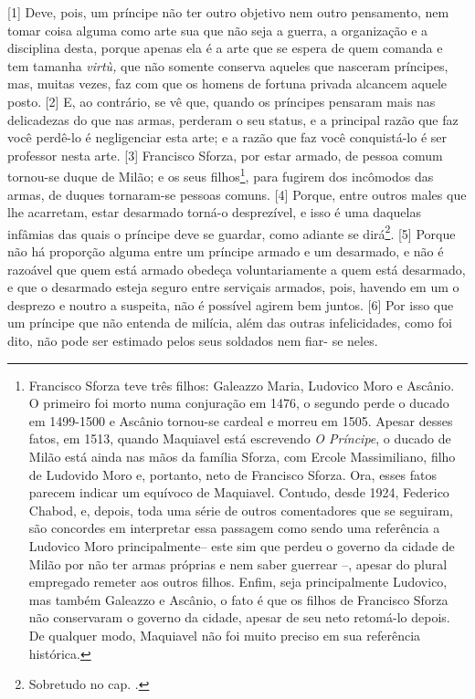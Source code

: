 {[}1{]} Deve, pois, um príncipe não ter outro objetivo nem outro
pensamento, nem tomar coisa alguma como arte sua que não seja a guerra,
a organização e a disciplina desta, porque apenas ela é a arte que se
espera de quem comanda e tem tamanha \emph{virtù,} que não somente
conserva aqueles que nasceram príncipes, mas, muitas vezes, faz com que
os homens de fortuna privada alcancem aquele posto. {[}2{]} E, ao
contrário, se vê que, quando os príncipes pensaram mais nas delicadezas
do que nas armas, perderam o seu status, e a principal razão que faz
você perdê-lo é negligenciar esta arte; e a razão que faz você
conquistá-lo é ser professor nesta arte. {[}3{]} Francisco Sforza, por
estar armado, de pessoa comum tornou-se duque de Milão; e os seus
filhos\footnote{Francisco Sforza teve três filhos: Galeazzo Maria,
  Ludovico Moro e Ascânio. O primeiro foi morto numa conjuração em 1476,
  o segundo perde o ducado em 1499-1500 e Ascânio tornou-se cardeal e
  morreu em 1505. Apesar desses fatos, em 1513, quando Maquiavel está
  escrevendo \emph{O Príncipe}, o ducado de Milão está ainda nas mãos da
  família Sforza, com Ercole Massimiliano, filho de Ludovido Moro e,
  portanto, neto de Francisco Sforza. Ora, esses fatos parecem indicar
  um equívoco de Maquiavel. Contudo, desde 1924, Federico Chabod, e,
  depois, toda uma série de outros comentadores que se seguiram, são
  concordes em interpretar essa passagem como sendo uma referência a
  Ludovico Moro principalmente-- este sim que perdeu o governo da cidade
  de Milão por não ter armas próprias e nem saber guerrear --, apesar do
  plural empregado remeter aos outros filhos. Enfim, seja principalmente
  Ludovico, mas também Galeazzo e Ascânio, o fato é que os filhos de
  Francisco Sforza não conservaram o governo da cidade, apesar de seu
  neto retomá-lo depois. De qualquer modo, Maquiavel não foi muito
  preciso em sua referência histórica.}, para fugirem dos incômodos das
armas, de duques tornaram-se pessoas comuns. {[}4{]} Porque, entre
outros males que lhe acarretam, estar desarmado torná-o desprezível, e
isso é uma daquelas infâmias das quais o príncipe deve se guardar, como
adiante se dirá\footnote{Sobretudo no cap. .}. {[}5{]} Porque não há
proporção alguma entre um príncipe armado e um desarmado, e não é
razoável que quem está armado obedeça voluntariamente a quem está
desarmado, e que o desarmado esteja seguro entre serviçais armados,
pois, havendo em um o desprezo e noutro a suspeita, não é possível
agirem bem juntos. {[}6{]} Por isso que um príncipe que não entenda de
milícia, além das outras infelicidades, como foi dito, não pode ser
estimado pelos seus soldados nem fiar- se neles.

